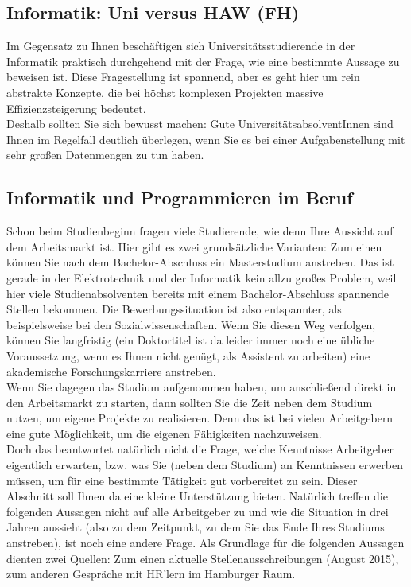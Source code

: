 \subsection{Informatik: Uni versus HAW (FH)}

Im Gegensatz zu Ihnen beschäftigen sich Universitätsstudierende in der Informatik praktisch durchgehend mit der Frage, wie eine bestimmte Aussage zu beweisen ist. Diese Fragestellung ist spannend, aber es geht hier um rein abstrakte Konzepte, die bei höchst komplexen Projekten massive Effizienzsteigerung bedeutet.\\

Deshalb sollten Sie sich bewusst machen: Gute UniversitätsabsolventInnen sind Ihnen im Regelfall deutlich überlegen, wenn Sie es bei einer Aufgabenstellung mit sehr großen Datenmengen zu tun haben.

\subsection{Informatik und Programmieren im Beruf}

Schon beim Studienbeginn fragen viele Studierende, wie denn Ihre Aussicht auf dem Arbeitsmarkt ist. Hier gibt es zwei grundsätzliche Varianten: Zum einen können Sie nach dem Bachelor-Abschluss ein Masterstudium anstreben. Das ist gerade in der Elektrotechnik und der Informatik kein allzu großes Problem, weil hier viele Studienabsolventen bereits mit einem Bachelor-Abschluss spannende Stellen bekommen. Die Bewerbungssituation ist also entspannter, als beispielsweise bei den Sozialwissenschaften. Wenn Sie diesen Weg verfolgen, können Sie langfristig (ein Doktortitel ist da leider immer noch eine übliche Voraussetzung, wenn es Ihnen nicht genügt, als Assistent zu arbeiten) eine akademische Forschungskarriere anstreben.\\

Wenn Sie dagegen das Studium aufgenommen haben, um anschließend direkt in den Arbeitsmarkt zu starten, dann sollten Sie die Zeit neben dem Studium nutzen, um eigene Projekte zu realisieren. Denn das ist bei vielen Arbeitgebern eine gute Möglichkeit, um die eigenen Fähigkeiten nachzuweisen.\\

Doch das beantwortet natürlich nicht die Frage, welche Kenntnisse Arbeitgeber eigentlich erwarten, bzw. was Sie (neben dem Studium) an Kenntnissen erwerben müssen, um für eine bestimmte Tätigkeit gut vorbereitet zu sein. Dieser Abschnitt soll Ihnen da eine kleine Unterstützung bieten. Natürlich treffen die folgenden Aussagen nicht auf alle Arbeitgeber zu und wie die Situation in drei Jahren aussieht (also zu dem Zeitpunkt, zu dem Sie das Ende Ihres Studiums anstreben), ist noch eine andere Frage. Als Grundlage für die folgenden Aussagen dienten zwei Quellen: Zum einen aktuelle Stellenausschreibungen (August 2015), zum anderen Gespräche mit HR’lern im Hamburger Raum.\\

